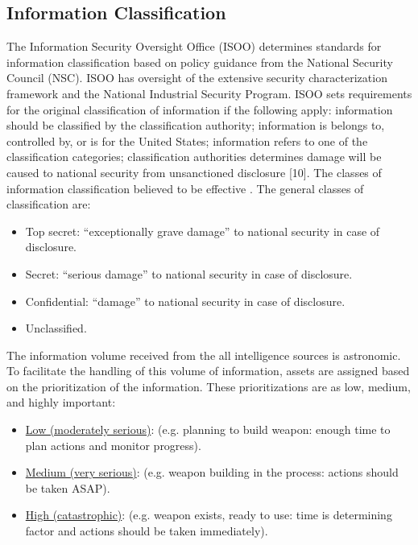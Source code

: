 \documentclass{report}
\begin{document}
\subsection{Information Classification}

The Information Security Oversight Office (ISOO) determines standards for information classification based on policy guidance from the National Security Council (NSC). ISOO has oversight of the extensive security characterization framework and the National Industrial Security Program. ISOO sets requirements for the original classification of information if the following apply: information should be classified by the classification authority; information is belongs to, controlled by, or is for the United States; information refers to one of the classification categories; classification authorities determines damage will be caused to national security from unsanctioned disclosure [10]. The classes of information classification believed to be effective \cite{Richelson2011}.  The general classes of classification are:

\begin{itemize}
  \item Top secret: \enquote{exceptionally grave damage} to national security in case of disclosure.
  \item Secret: \enquote{serious damage} to national security in case of disclosure.
  \item Confidential: \enquote{damage} to national security in case of disclosure.
  \item Unclassified.
\end{itemize}

The information volume received from the all intelligence sources is astronomic. To facilitate the handling of this volume of information, assets are assigned based on the prioritization of the information. These prioritizations are as low, medium, and highly important:

\begin{itemize}
  \item \underline{Low (moderately serious)}: (e.g. planning to build weapon: enough time to plan actions and monitor progress).
  \item \underline{Medium (very serious)}: (e.g. weapon building in the process: actions should be taken ASAP).
  \item \underline{High (catastrophic)}: (e.g. weapon exists, ready to use: time is determining factor and actions should be taken immediately).
\end{itemize}
\end{document}
